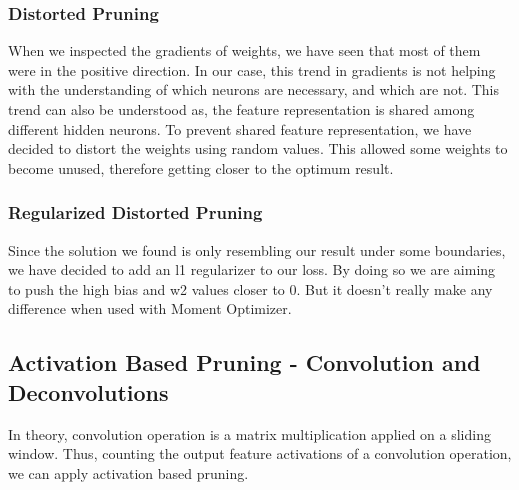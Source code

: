 \subsubsection{Distorted Pruning}
When we inspected the gradients of weights, we have seen that most of them were in the positive direction. In our case, this trend in gradients is not helping with the understanding of which neurons are necessary, and which are not. This trend can also be understood as, the feature representation is shared among different hidden neurons. 
To prevent shared feature representation, we have decided to distort the weights using random values. This allowed some weights to become unused, therefore getting closer to the optimum result.
\subsubsection{Regularized Distorted Pruning}
Since the solution we found is only resembling our result under some boundaries, we have decided to add an l1 regularizer to our loss. By doing so we are aiming to push the high bias and w2 values closer to 0. But it doesn't really make any difference when used with Moment Optimizer.


\subsection{Activation Based Pruning - Convolution and Deconvolutions}
In theory, convolution operation is a matrix multiplication applied on a sliding window. Thus, counting the output feature activations of a convolution operation, we can apply activation based pruning. 

